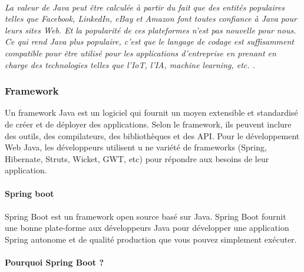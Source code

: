         \paragraph{}
        \textit{La valeur de Java peut être calculée à partir du fait que des entités populaires 
        telles que Facebook, LinkedIn, eBay et Amazon font toutes confiance à Java pour leurs 
        sites Web. Et la popularité de ces plateformes n'est pas nouvelle pour nous.
        Ce qui rend Java plus populaire, c'est que le langage de codage est suffisamment 
        compatible pour être utilisé pour les applications d'entreprise en prenant en charge 
        des technologies telles que l'IoT, l'IA, machine learning, etc. \cite{whyjava}.}
        
        \subsubsection{Framework }
        Un framework Java est un logiciel qui fournit un moyen extensible et standardisé de créer 
        et de déployer des applications. Selon le framework, ils peuvent inclure des outils, 
        des compilateurs, des bibliothèques et des API. Pour le développement Web Java, les développeurs utilisent u
        ne variété de frameworks (Spring, Hibernate, Struts, Wicket, GWT, etc) pour répondre aux besoins de 
        leur application.
        \paragraph{Spring boot}
        \paragraph{}
        Spring Boot est un framework open source basé sur Java. Spring Boot fournit une bonne plate-forme aux développeurs Java pour 
        développer une application Spring autonome et de qualité production que vous pouvez simplement exécuter. 
        \paragraph{Pourquoi Spring Boot ?}
